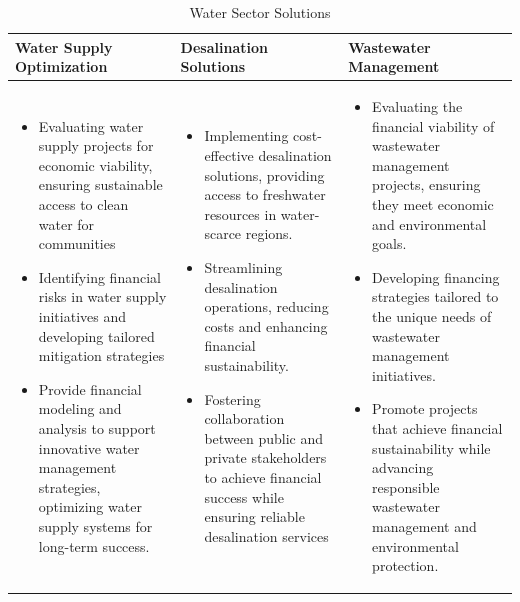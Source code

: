 \begin{table}[h]
    \centering
    \caption{Water Sector Solutions}
    \label{tab1}
    \begin{tabular}{|>{\raggedright\arraybackslash}p{4.5cm}|>{\raggedright\arraybackslash}p{4.5cm}|>{\raggedright\arraybackslash}p{4.5cm}|}
        \hline
        \rowcolor[gray]{0.8}
        \textbf{Water Supply Optimization} & \textbf{Desalination Solutions} & \textbf{Wastewater Management} \\ \hline
        \begin{itemize}
            \item Evaluating water supply projects for economic viability, ensuring sustainable access to clean water for communities
            \item Identifying financial risks in water supply initiatives and developing tailored mitigation strategies
            \item Provide financial modeling and analysis to support innovative water management strategies, optimizing water supply systems for long-term success.
        \end{itemize}
        &
        \begin{itemize}
            \item Implementing cost-effective desalination solutions, providing access to freshwater resources in water-scarce regions.
            \item Streamlining desalination operations, reducing costs and enhancing financial sustainability.
            \item Fostering collaboration between public and private stakeholders to achieve financial success while ensuring reliable desalination services
        \end{itemize}
        &
        \begin{itemize}
            \item Evaluating the financial viability of wastewater management projects, ensuring they meet economic and environmental goals.
            \item Developing financing strategies tailored to the unique needs of wastewater management initiatives.
            \item Promote projects that achieve financial sustainability while advancing responsible wastewater management and environmental protection.
        \end{itemize} \\ \hline
    \end{tabular}
\end{table}

